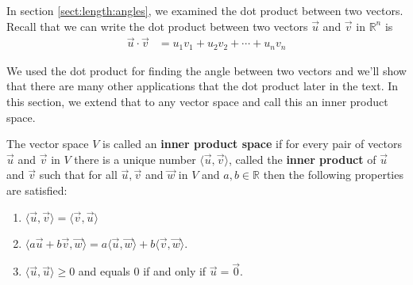 In section \ref{sect:length:angles}, we examined the dot product between two vectors.  Recall that we can write the dot product between two vectors $\vec{u}$ and $\vec{v}$ in $\mathbb{R}^n$ is 
\begin{align*}
\vec{u} \cdot \vec{v} & = u_1v_1 + u_2v_2 + \cdots +u_nv_n 
\end{align*}

We used the dot product for finding the angle between two vectors and we'll show that there are many other applications that the dot product later in the text.   In this section, we extend that to any vector space and call this an inner product space. 

\begin{definition}
The vector space $V$ is called an \textbf{inner product space}  if for every pair of vectors $\vec{u}$ and $\vec{v}$ in $V$ there is a unique number $\langle \vec{u}, \vec{v} \rangle$, called the \textbf{inner product} of $\vec{u}$ and $\vec{v}$ such that for all  $\vec{u}, \vec{v}$ and $\vec{w}$ in $V$ and $a, b \in \mathbb{R}$ then the following properties are satisfied: 

\begin{enumerate}
 \item $\langle \vec{u}, \vec{v} \rangle = \langle \vec{v}, \vec{u} \rangle$
 \item $\langle a \vec{u} + b \vec{v}, \vec{w} \rangle = a \langle \vec{u}, \vec{w} \rangle + b \langle \vec{v}, \vec{w} \rangle$.  
 \item $\langle \vec{u}, \vec{u} \rangle \geq 0$ and equals 0 if and only if $\vec{u} = \vec{0}$.  
\end{enumerate}

\end{definition}




